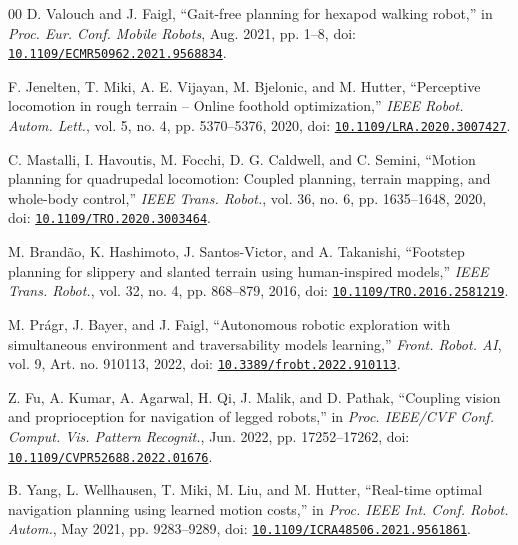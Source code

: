 \documentclass{ieeeaccess}
\begin{document}
\begin{thebibliography}{00}
D. Valouch and J. Faigl, \textquotedblleft{}Gait-free planning for hexapod walking robot,\textquotedblright{} in \emph{Proc. Eur. Conf. Mobile Robots}, Aug. 2021, pp. 1--8, doi: \href{https://doi.org/10.1109/ECMR50962.2021.9568834}{\nolinkurl{10.1109/ECMR50962.2021.9568834}}.

F. Jenelten, T. Miki, A. E. Vijayan, M. Bjelonic, and M. Hutter, \textquotedblleft{}Perceptive locomotion in rough terrain -- Online foothold optimization,\textquotedblright{} \emph{IEEE Robot. Autom. Lett.}, vol. 5, no. 4, pp. 5370--5376, 2020, doi: \href{https://doi.org/10.1109/LRA.2020.3007427}{\nolinkurl{10.1109/LRA.2020.3007427}}.

C. Mastalli, I. Havoutis, M. Focchi, D. G. Caldwell, and C. Semini, \textquotedblleft{}Motion planning for quadrupedal locomotion: Coupled planning, terrain mapping, and whole-body control,\textquotedblright{} \emph{IEEE Trans. Robot.}, vol. 36, no. 6, pp. 1635--1648, 2020, doi: \href{https://doi.org/10.1109/TRO.2020.3003464}{\nolinkurl{10.1109/TRO.2020.3003464}}.

M. Brandão, K. Hashimoto, J. Santos-Victor, and A. Takanishi, \textquotedblleft{}Footstep planning for slippery and slanted terrain using human-inspired models,\textquotedblright{} \emph{IEEE Trans. Robot.}, vol. 32, no. 4, pp. 868--879, 2016, doi: \href{https://doi.org/10.1109/TRO.2016.2581219}{\nolinkurl{10.1109/TRO.2016.2581219}}.

M. Prágr, J. Bayer, and J. Faigl, \textquotedblleft{}Autonomous robotic exploration with simultaneous environment and traversability models learning,\textquotedblright{} \emph{Front. Robot. AI}, vol. 9, Art. no. 910113, 2022, doi: \href{https://doi.org/10.3389/frobt.2022.910113}{\nolinkurl{10.3389/frobt.2022.910113}}.

Z. Fu, A. Kumar, A. Agarwal, H. Qi, J. Malik, and D. Pathak, \textquotedblleft{}Coupling vision and proprioception for navigation of legged robots,\textquotedblright{} in \emph{Proc. IEEE/CVF Conf. Comput. Vis. Pattern Recognit.}, Jun. 2022, pp. 17252--17262, doi: \href{https://doi.org/10.1109/CVPR52688.2022.01676}{\nolinkurl{10.1109/CVPR52688.2022.01676}}.

B. Yang, L. Wellhausen, T. Miki, M. Liu, and M. Hutter, \textquotedblleft{}Real-time optimal navigation planning using learned motion costs,\textquotedblright{} in \emph{Proc. IEEE Int. Conf. Robot. Autom.}, May 2021, pp. 9283--9289, doi: \href{https://doi.org/10.1109/ICRA48506.2021.9561861}{\nolinkurl{10.1109/ICRA48506.2021.9561861}}.


\end{thebibliography}
\end{document}
